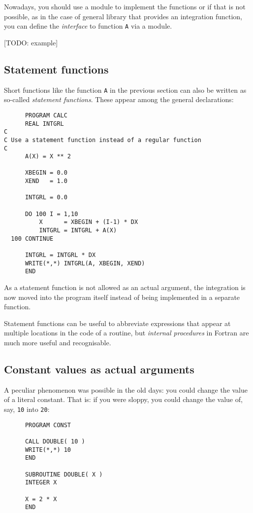 Nowadays, you should use a module to implement the functions or if that is
not possible, as in the case of general library that provides an integration
function, you can define the \emph{interface} to function \verb+A+ via a module.

[TODO: example]

\subsection{Statement functions}
Short functions like the function \verb+A+ in the previous section can also be
written as so-called \emph{statement functions}. These appear among the general
declarations:
\begin{verbatim}
      PROGRAM CALC
      REAL INTGRL
C
C Use a statement function instead of a regular function
C
      A(X) = X ** 2

      XBEGIN = 0.0
      XEND   = 1.0

      INTGRL = 0.0

      DO 100 I = 1,10
          X      = XBEGIN + (I-1) * DX
          INTGRL = INTGRL + A(X)
  100 CONTINUE

      INTGRL = INTGRL * DX
      WRITE(*,*) INTGRL(A, XBEGIN, XEND)
      END
\end{verbatim}

As a statement function is not allowed as an actual argument, the integration
is now moved into the program itself instead of being implemented in a separate
function.

Statement functions can be useful to abbreviate expressions that appear at
multiple locations in the code of a routine, but \emph{internal procedures}
in Fortran are much more useful and recognisable.


\subsection{Constant values as actual arguments}
A peculiar phenomenon was possible in the old days: you could change the
value of a literal constant. That is: if you were sloppy, you could change the
value of, say, \verb+10+ into \verb+20+:
\begin{verbatim}
      PROGRAM CONST

      CALL DOUBLE( 10 )
      WRITE(*,*) 10
      END

      SUBROUTINE DOUBLE( X )
      INTEGER X

      X = 2 * X
      END
\end{verbatim}

